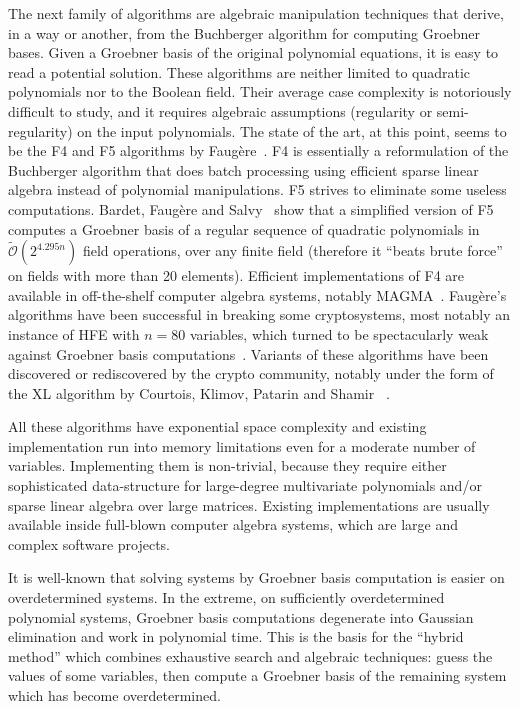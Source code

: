 \documentclass[a4paper,UKenglish,cleveref, autoref]{lipics-v2019}
\newcommand{\bigOsoft}[1]{\ensuremath{\mathcal{\tilde O}\left( #1 \right)} }
\begin{document}
The next family of algorithms are algebraic manipulation techniques that derive,
in a way or another, from the Buchberger algorithm for computing Groebner
bases. Given a Groebner basis of the original polynomial equations, it is easy
to read a potential solution. These algorithms are neither limited to quadratic
polynomials nor to the Boolean field. Their average case complexity is
notoriously difficult to study, and it requires algebraic assumptions
(regularity or semi-regularity) on the input polynomials. The state of the art,
at this point, seems to be the \textsf{F4} and \textsf{F5} algorithms by
Faugère~\cite{F4,F5}. \textsf{F4} is essentially a reformulation of the
Buchberger algorithm that does batch processing using efficient sparse linear
algebra instead of polynomial manipulations. \textsf{F5} strives to eliminate
some useless computations. Bardet, Faugère and Salvy~\cite{BardetFS15} show that
a simplified version of \textsf{F5} computes a Groebner basis of a regular
sequence of quadratic polynomials in $\bigOsoft{2^{4.295n}}$ field operations,
over any finite field (therefore it ``beats brute force'' on fields with more
than 20 elements). Efficient implementations of \textsf{F4} are available in
off-the-shelf computer algebra systems, notably
\textsf{MAGMA}~\cite{MAGMA}. Faugère's algorithms have been successful in
breaking some cryptosystems, most notably an instance of \textsf{HFE} with
$n=80$ variables, which turned to be spectacularly weak against Groebner basis
computations~\cite{FaugereJ03}. Variants of these algorithms have been
discovered or rediscovered by the crypto community, notably under the form of
the \textsf{XL} algorithm by Courtois, Klimov, Patarin and Shamir
~\cite{CourtoisKPS00}.

All these algorithms have exponential space complexity and existing
implementation run into memory limitations even for a moderate number of
variables. Implementing them is non-trivial, because they require either
sophisticated data-structure for large-degree multivariate polynomials and/or
sparse linear algebra over large matrices. Existing implementations are usually
available inside full-blown computer algebra systems, which are large and
complex software projects.

It is well-known that solving systems by Groebner basis computation is easier on
overdetermined systems. In the extreme, on sufficiently overdetermined
polynomial systems, Groebner basis computations degenerate into Gaussian
elimination and work in polynomial time. This is the basis for the ``hybrid
method'' which combines exhaustive search and algebraic techniques: guess the
values of some variables, then compute a Groebner basis of the remaining system
which has become overdetermined.
\end{document}
